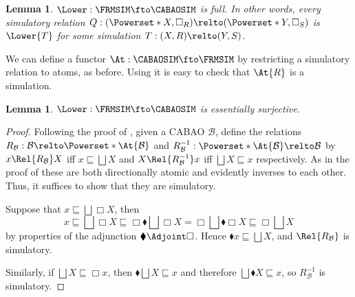 \documentclass[10pt,a4paper]{article}
\newtheorem{lemma}[theorem]{Lemma}
\begin{document}
\begin{lemma}
  \label{lemma:lower-frmsim-full}
  \(\Lower : \FRMSIM \fto \CABAOSIM\) is full. In other words, every simulatory
  relation
  \(Q : (\Powerset*{X}, \Box_R) \relto (\Powerset*{Y}, \Box_S)\)
  is \(\Lower{T}\) for some simulation \(T : (X, R) \relto (Y, S)\).
\end{lemma}

We can define a functor \(\At : \CABAOSIM \fto \FRMSIM\) by
restricting a simulatory relation to atoms, as before. Using
 it is easy to check that \(\At{R}\) is a
simulation.

\begin{lemma}
  \label{lemma:lower-frmsim-dense}
  \(\Lower : \FRMSIM \fto \CABAOSIM\) is essentially surjective.
\end{lemma}
\begin{proof}
  Following the proof of ,
  given a CABAO \(\mathcal{B}\), define the relations
  \(R_{\mathcal{B}} : \mathcal{B} \relto \Powerset*{\At{\mathcal{B}}}\) and
  \(R_{\mathcal{B}}^{-1} : \Powerset*{\At{\mathcal{B}}} \relto \mathcal{B}\)
  by
  \(x \Rel{R_{\mathcal{B}}} X\) iff \(x \sqsubseteq \bigsqcup X\)
  and
  \(X \Rel{R^{-1}_{\mathcal{B}}} x\) iff \(\bigsqcup X \sqsubseteq x\)
  respectively.
  As in the proof of  these are both directionally
  atomic and evidently inverses to each other. Thus, it suffices to show that
  they are simulatory.

  Suppose that \(x \sqsubseteq \bigsqcup \Box X\), then
  \[
    x
    \sqsubseteq \bigsqcup \Box X
    \sqsubseteq \Box \blacklozenge \bigsqcup \Box X
    = \Box \bigsqcup \blacklozenge \Box X
    \sqsubseteq \Box \bigsqcup X
  \]
  by properties of the adjunction $\blacklozenge \Adjoint \Box$.
  Hence $\blacklozenge x \sqsubseteq \bigsqcup X$, and $\Rel{R_\mathcal{B}}$ is
  simulatory.

  Similarly, if \(\bigsqcup X \sqsubseteq \Box x\), then \(\blacklozenge
  \bigsqcup X \sqsubseteq x\) and therefore \(\bigsqcup \blacklozenge X
  \sqsubseteq x\), so \(R_{\mathcal{B}}^{-1}\) is simulatory.
\end{proof}
\end{document}

